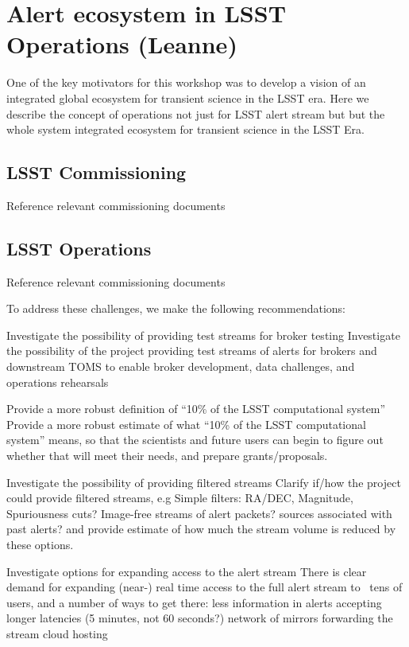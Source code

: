 \section{Alert ecosystem in  LSST  Operations (Leanne)} \label{sec:conops}
One of the key motivators for this workshop was to develop a vision of an integrated global ecosystem for  {transient} science in the  LSST era. Here we describe the concept of operations not just for  LSST alert stream but but the whole system integrated ecosystem for  {transient} science in the  LSST Era. 


\subsection{LSST  Commissioning}
Reference relevant commissioning documents

\subsection{LSST  Operations}
Reference relevant commissioning documents


To address these challenges, we make the following recommendations:

{Investigate the possibility of providing test streams for broker testing}
{Investigate the possibility of the project providing test streams of alerts for brokers and downstream  {TOMS} to enable broker development, data challenges, and operations rehearsals
}

{Provide a more robust definition of “10\% of the  LSST computational system”}
{Provide a more robust estimate of what “10\% of the  LSST computational system” means, so that the scientists and future users can begin to figure out whether that will meet their needs, and prepare grants/proposals.
}

{Investigate the possibility of providing filtered streams}
{Clarify if/how the project could provide filtered streams, e.g
Simple filters:  {RA}/DEC, Magnitude, Spuriousness cuts?
Image-free streams of alert packets?
sources associated with past alerts?
and provide estimate of how much the stream volume is reduced by these options.
}

{Investigate options for expanding access to the alert stream}
{There is clear demand for expanding (near-) real time access to the full alert stream to ~tens of users, and a number of ways to get there:
less information in alerts
accepting longer latencies (5 minutes, not 60 seconds?)
network of mirrors forwarding the stream
cloud hosting}